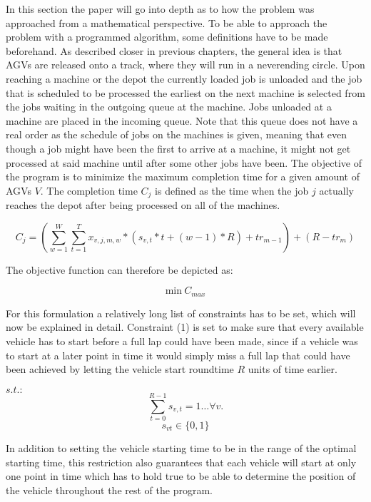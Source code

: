 In this section the paper will go into depth as to how the problem was approached from a mathematical perspective. To be able to approach the problem
with a programmed algorithm, some definitions have to be made beforehand. As described closer in previous chapters, the general idea is that AGVs
are released onto a track, where they will run in a neverending circle. Upon reaching a machine or the depot the currently loaded job is unloaded and
the job that is scheduled to be processed the earliest on the next machine is selected from the jobs waiting in the outgoing queue at the machine.
Jobs unloaded at a machine are placed in the incoming queue. Note that this queue does not have a real order as the schedule of jobs on the machines is
given, meaning that even though a job might have been the first to arrive at a machine, it might not get processed at said machine until after some
other jobs have been. The objective of the program is to minimize the maximum completion time for a given amount of AGVs \(V\). The completion time
\(C_{j}\) is defined as the time when the job \(j\) actually reaches the depot after being processed on all of the machines.

\[
  C_{j} = (\sum_{w=1}^{W}\sum_{t=1}^{T} x_{v,j,m,w} * (s_{v,t} * t + (w-1) * R) + tr_{m-1}) + (R-tr_{m})
\]

The objective function can therefore be depicted as:

\begin{equation}
\mathrm{min}\>C_{max}
\end{equation}

For this formulation a relatively long list of constraints has to be set, which will now be explained in detail. Constraint (1) is set to make sure
that every available vehicle has to start before a full lap could have been made, since if a vehicle was to start at a later point in time it would
simply miss a full lap that could have been achieved by letting the vehicle start roundtime \(R\) units of time earlier.

\(s.t.:\)
\begin{equation}
\sum_{t=0}^{R-1}s_{v,t} = 1\ldots \forall v.
\end{equation}
\begin{equation}
s_{v t}\in\{0,1\}
\end{equation}

In addition to setting the vehicle starting time to be in the range of the optimal starting time, this restriction also guarantees that each vehicle
will start at only one point in time which has to hold true to be able to determine the position of the vehicle throughout the rest of the program.

